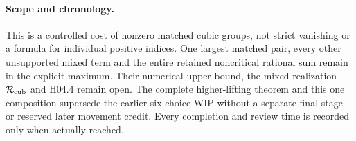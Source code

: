 \paragraph{Scope and chronology.}
This is a controlled cost of nonzero matched cubic groups, not
strict vanishing or a formula for individual positive indices.
One largest matched pair, every other unsupported mixed term
and the entire retained noncritical rational sum remain in the
explicit maximum. Their numerical upper bound, the mixed
realization $\mathcal R_{\rm cub}$ and H04.4 remain open.
The complete higher-lifting theorem and this one composition
supersede the earlier six-choice WIP without a separate final
stage or reserved later movement credit. Every completion and
review time is recorded only when actually reached.
